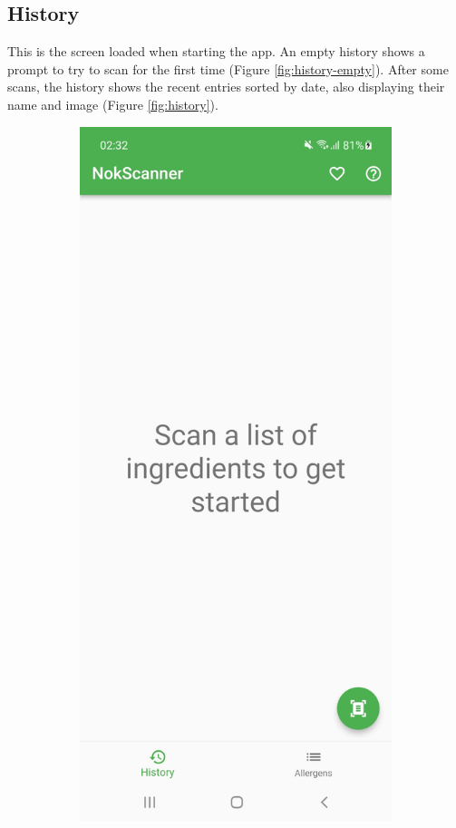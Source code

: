 \subsection{History}

This is the screen loaded when starting the app. An empty history shows a prompt to try to scan for the first time (Figure \ref{fig:history-empty}). After some scans, the history shows the recent entries sorted by date, also displaying their name and image (Figure \ref{fig:history}).

\begin{figure}[h]
    \begin{subfigure}{0.5\textwidth}
        \centering
        \includegraphics[width=0.9\linewidth]{Figures/Screenshot/history_empty.jpg} 

\end{subfigure}
\end{figure}
